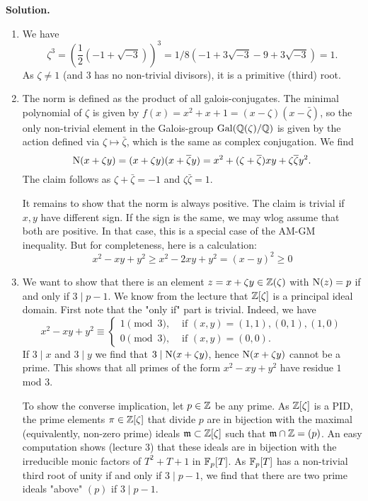 \documentclass[a4paper,11pt]{article}
\begin{document}
\textbf{Solution.}
\begin{enumerate}
    \item We have 
        $$\zeta^3 = \left(\frac 12 (-1 + \sqrt{-3})\right)^3 = 1/8(-1 +
        3\sqrt{-3} - 9 + 3 \sqrt{-3}) = 1.$$ 
        As $\zeta \neq 1$ (and $3$ has no non-trivial
        divisors), it is a primitive (third) root. 
    \item The norm is defined as the product of all galois-conjugates. The minimal
        polynomial of $\zeta$ is given by $f(x) = x^2 + x + 1 = (x - \zeta)(x -
        \bar \zeta)$, so the only non-trivial element in the Galois-group
        $\operatorname{Gal}(\mathbb{Q}(\zeta)/\mathbb{Q})$ is given by the action defined via 
        $\zeta \mapsto \bar \zeta$, which is the same as complex conjugation. 
        We find 
        $$\operatorname{N}(x+\zeta y) = (x+\zeta y)(x + \overline \zeta y) = x^2 + (\zeta +
        \overline \zeta)xy + \zeta \overline \zeta y^2.$$
        The claim follows as $\zeta + \bar \zeta = -1$ and $\zeta \bar \zeta = 1$. 

        It remains to show that the norm is always positive. The claim is 
        trivial if $x,y$ have different sign. If the sign is the same, we may
        wlog assume that both are positive. In that case, this is a special case
        of the AM-GM inequality. But for completeness, here is a calculation:
        $$ x^2 -xy +y^2 \geq x^2 - 2xy + y^2 = (x-y)^2 \geq 0$$

    \item We want to show that there is an element $z = x + \zeta y \in \mathbb{Z}(\zeta)$ 
        with $\operatorname{N}(z) = p$ if and only if $3 \mid p-1$. We know from the lecture
        that $\mathbb{Z}[\zeta]$ is a principal ideal domain. 
        First note that the "only if" part is trivial. Indeed, we have
        \begin{equation*}
            x^2 -xy + y^2 \equiv \begin{cases}
                1 \pmod 3, &\text{ if } (x,y) = (1,1), (0,1), (1,0)\\
                0 \pmod 3, &\text{ if } (x,y) = (0,0).
            \end{cases}
        \end{equation*}
        If $3 \mid x$ and $3 \mid y$ we find that $3 \mid \operatorname{N}(x+\zeta y)$,
        hence $\operatorname{N}(x+\zeta y)$ cannot be a prime. This shows that all primes
        of the form $x^2 -xy + y^2$ have residue $1$ mod $3$. 

        To show the converse implication, let $p \in \mathbb{Z}$ be any prime. 
        As $\mathbb{Z}[\zeta]$ is a PID, the prime elements $\pi \in \mathbb{Z}[\zeta]$
        that divide $p$ are in bijection with the maximal (equivalently,
        non-zero prime) ideals $\mathfrak{m} \subset \mathbb{Z}[\zeta]$ such that $\mathfrak{m} \cap \mathbb{Z} =
        (p)$. An easy computation shows (lecture 3) that these ideals are in
        bijection with the irreducible monic factors of $T^2 + T + 1$ in
        $\mathbb{F}_p[T]$. As $\mathbb{F}_p[T]$ has a non-trivial third root of unity if and
        only if $3 \mid p-1$, we find that there are 
        two prime ideals "above" $(p)$ if $3 \mid p-1$.


\end{enumerate}
\end{document}
